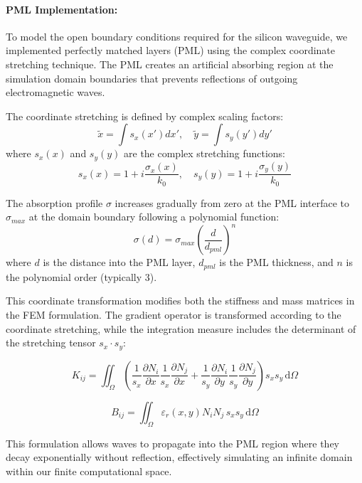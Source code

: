 \documentclass[10pt,letterpaper]{article}
\begin{document}
\paragraph{PML Implementation:} 
To model the open boundary conditions required for the silicon waveguide, we implemented perfectly matched layers (PML) using the complex coordinate stretching technique. The PML creates an artificial absorbing region at the simulation domain boundaries that prevents reflections of outgoing electromagnetic waves.

The coordinate stretching is defined by complex scaling factors:
\begin{equation}
\tilde{x} = \int s_x(x') dx', \quad \tilde{y} = \int s_y(y') dy'
\end{equation}
where $s_x(x)$ and $s_y(y)$ are the complex stretching functions:
\begin{equation}
s_x(x) = 1 + i\frac{\sigma_x(x)}{k_0}, \quad s_y(y) = 1 + i\frac{\sigma_y(y)}{k_0}
\end{equation}

The absorption profile $\sigma$ increases gradually from zero at the PML interface to $\sigma_{max}$ at the domain boundary following a polynomial function:
\begin{equation}
\sigma(d) = \sigma_{max}\left(\frac{d}{d_{pml}}\right)^n
\end{equation}
where $d$ is the distance into the PML layer, $d_{pml}$ is the PML thickness, and $n$ is the polynomial order (typically 3).

This coordinate transformation modifies both the stiffness and mass matrices in the FEM formulation. The gradient operator is transformed according to the coordinate stretching, while the integration measure includes the determinant of the stretching tensor $s_x \cdot s_y$:

\begin{equation}
K_{ij} = \iint_{\Omega} \left(\frac{1}{s_x}\frac{\partial N_i}{\partial x}\frac{1}{s_x}\frac{\partial N_j}{\partial x} + \frac{1}{s_y}\frac{\partial N_i}{\partial y}\frac{1}{s_y}\frac{\partial N_j}{\partial y} \right) s_x s_y \, \mathrm{d}\Omega
\end{equation}

\begin{equation}
B_{ij} = \iint_{\Omega} \varepsilon_r(x,y) N_i N_j \, s_x s_y \, \mathrm{d}\Omega
\end{equation}

This formulation allows waves to propagate into the PML region where they decay exponentially without reflection, effectively simulating an infinite domain within our finite computational space.
\end{document}
